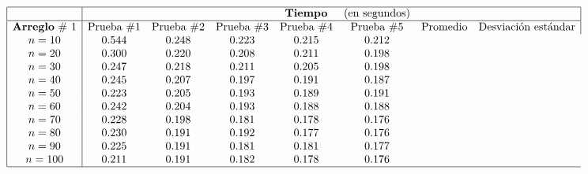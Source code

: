 \documentclass{article}
\begin{document}
	$$\begin{array}{|c|ccccccc|}
		\hline
		& & &&\text{\textbf{Tiempo}} &\text{(en segundos)} & &\\
		\hline
		\text{\textbf{Arreglo}\ \# 1} & \text{Prueba}\ \# 1 & \text{Prueba}\ \# 2 & \text{Prueba}\ \# 3 & \text{Prueba}\ \# 4 & \text{Prueba}\ \# 5 & \text{Promedio} & \text{Desviación estándar}\\
		n = 10 & 0.544 & 0.248 & 0.223 & 0.215 & 0.212\\
		n = 20 & 0.300 & 0.220 & 0.208 & 0.211 & 0.198\\
		n = 30 & 0.247 & 0.218 & 0.211 & 0.205 & 0.198\\
		n = 40 & 0.245 & 0.207 & 0.197 & 0.191 & 0.187\\
		n = 50 & 0.223 & 0.205 & 0.193 & 0.189 & 0.191\\
		n = 60 & 0.242 & 0.204 & 0.193 & 0.188 & 0.188\\
		n = 70 & 0.228 & 0.198 & 0.181 & 0.178 & 0.176\\
		n = 80 & 0.230 & 0.191 & 0.192 & 0.177 & 0.176\\
		n = 90 & 0.225 & 0.191 & 0.181 & 0.181 & 0.177\\
		n = 100 & 0.211 & 0.191 & 0.182 & 0.178 & 0.176\\
		\hline
	\end{array}$$
\end{document}
